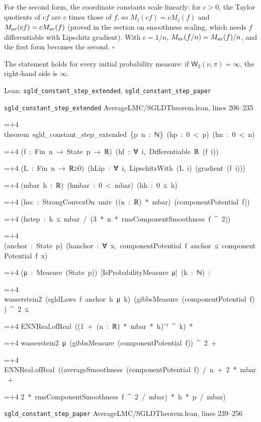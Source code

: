 \documentclass[11pt,a4paper]{report}
\newlength{\leancharwidth}
\newenvironment{leancode}{\par\smallskip\begingroup\ttfamily\footnotesize\raggedright
  \settowidth{\leancharwidth}{M}\setlength{\parskip}{0pt}\setlength{\parindent}{0pt}
  \frenchspacing}{\par\endgroup\smallskip}
\newcommand{\leanline}[2]{\hangindent=\dimexpr#1\leancharwidth+4\leancharwidth\relax
  \hangafter=1\noindent\hspace*{#1\leancharwidth}#2\par}
\newcommand{\leansource}[1]{\par{\footnotesize\color{leanmuted}#1}\par}
\begin{document}
For the second form, the coordinate constants scale linearly: for \(c>0\), the Taylor quotients of \(cf\) are \(c\) times those of \(f\), so \(M_j(cf)=cM_j(f)\) and \(M_{\rm av}(cf)=cM_{\rm av}(f)\) (proved in the section on smoothness scaling, which needs \(f\) differentiable with Lipschitz gradient). With \(c=1/n\), \(M_{\rm av}(f/n)=M_{\rm av}(f)/n\), and the first form becomes the second. \(\square\)




The statement holds for every initial probability measure: if \(\mathsf W_2(\nu,\pi)=\infty\), the right-hand side is \(\infty\).

\begin{leanbox}{Lean: \texttt{sgld\_\allowbreak{}constant\_\allowbreak{}step\_\allowbreak{}extended}, \texttt{sgld\_\allowbreak{}constant\_\allowbreak{}step\_\allowbreak{}paper}}
\leansource{\texttt{sgld\_\allowbreak{}constant\_\allowbreak{}step\_\allowbreak{}extended} \quad AverageLMC/\allowbreak{}SGLDTheorem.lean, lines 206–235}
\begin{leancode}
\leanline{0}{theorem\ sgld\_constant\_step\_extended\ \{p\ n\ :\ ℕ\}\ (hp\ :\ 0\ <\ p)\ (hn\ :\ 0\ <\ n)}
\leanline{4}{(f\ :\ Fin\ n\ →\ State\ p\ →\ ℝ)\ (hf\ :\ ∀\ i,\ Differentiable\ ℝ\ (f\ i))}
\leanline{4}{(L\ :\ Fin\ n\ →\ ℝ≥0)\ (hLip\ :\ ∀\ i,\ LipschitzWith\ (L\ i)\ (gradient\ (f\ i)))}
\leanline{4}{(mbar\ h\ :\ ℝ)\ (hmbar\ :\ 0\ <\ mbar)\ (hh\ :\ 0\ ≤\ h)}
\leanline{4}{(hsc\ :\ StrongConvexOn\ univ\ ((n\ :\ ℝ)\ *\ mbar)\ (componentPotential\ f))}
\leanline{4}{(hstep\ :\ h\ ≤\ mbar\ /\ (3\ *\ n\ *\ rmsComponentSmoothness\ f\ \textasciicircum{}\ 2))}
\leanline{4}{(anchor\ :\ State\ p)\ (hanchor\ :\ ∀\ x,\ componentPotential\ f\ anchor\ ≤\ componentPotential\ f\ x)}
\leanline{4}{(μ\ :\ Measure\ (State\ p))\ [IsProbabilityMeasure\ μ]\ (k\ :\ ℕ)\ :}
\leanline{4}{wasserstein2\ (sgldLaws\ f\ anchor\ h\ μ\ k)\ (gibbsMeasure\ (componentPotential\ f))\ \textasciicircum{}\ 2\ ≤}
\leanline{6}{ENNReal.ofReal\ ((1\ +\ (n\ :\ ℝ)\ *\ mbar\ *\ h)⁻¹\ \textasciicircum{}\ k)\ *}
\leanline{8}{wasserstein2\ μ\ (gibbsMeasure\ (componentPotential\ f))\ \textasciicircum{}\ 2\ +}
\leanline{6}{ENNReal.ofReal\ ((averageSmoothness\ (componentPotential\ f)\ /\ n\ +\ 2\ *\ mbar\ +}
\leanline{8}{2\ *\ rmsComponentSmoothness\ f\ \textasciicircum{}\ 2\ /\ mbar)\ *\ h\ *\ p\ /\ mbar)}
\end{leancode}
\leansource{\texttt{sgld\_\allowbreak{}constant\_\allowbreak{}step\_\allowbreak{}paper} \quad AverageLMC/\allowbreak{}SGLDTheorem.lean, lines 239–256}
\begin{leancode}

\end{leancode}
\end{leanbox}
\end{document}
